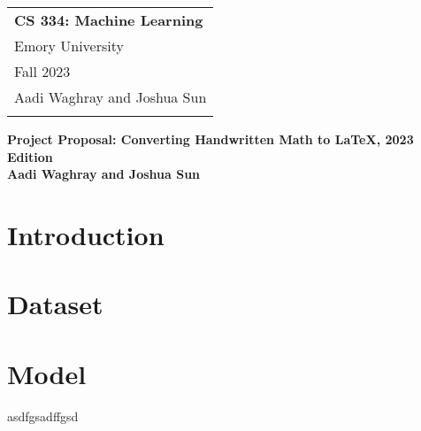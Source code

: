 \documentclass{article}
\begin{document}
\thispagestyle{empty}

\begin{tabular}{p{10.5cm}}
	{\large \bf CS 334: Machine Learning} \\
	Emory University                      \\ Fall 2023  \\ Aadi Waghray and Joshua Sun\\
	\bottomrule
	\\
\end{tabular}

\vspace*{0.3cm}

\begin{center}
	{\Large \bf Project Proposal: Converting Handwritten Math to \LaTeX, 2023 Edition}\\
	\vspace*{0.02cm}
	{\bf Aadi Waghray and Joshua Sun}
\end{center}

\vspace{0.4cm}

\section*{Introduction}


\section*{Dataset}


\section*{Model}


\newpage
asdfgsadffgsd \cite*{Schechter_2017}
\printbibliography
\end{document}
